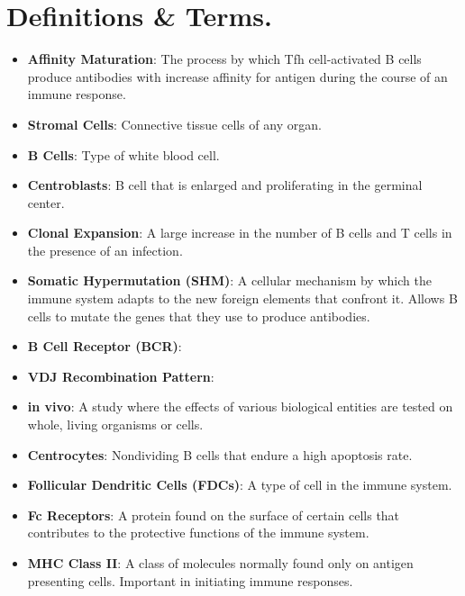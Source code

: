 \documentclass[english]{article}
\begin{document}
\section{Definitions \& Terms.}

\begin{itemize}


\item \textbf{Affinity Maturation}: The process by which Tfh cell-activated B cells produce antibodies with increase affinity for antigen during the course of an immune response. 

\item \textbf{Stromal Cells}: Connective tissue cells of any organ.
 
\item \textbf{B Cells}: Type of white blood cell. 

\item \textbf{Centroblasts}: B cell that is enlarged and proliferating in the germinal center.

\item \textbf{Clonal Expansion}: A large increase in the number of B cells and T cells in the presence of an infection. 

\item \textbf{Somatic Hypermutation (SHM)}: A cellular mechanism by which the immune system adapts to the new foreign elements that confront it. Allows B cells to mutate the genes that they use to produce antibodies. 

\item \textbf{B Cell Receptor (BCR)}:

\item \textbf{VDJ Recombination Pattern}: 

\item \textbf{in vivo}: A study where the effects of various biological entities are tested on whole, living organisms or cells. 

\item \textbf{Centrocytes}: Nondividing B cells that endure a high apoptosis rate. 

\item \textbf{Follicular Dendritic Cells (FDCs)}: A type of cell in the immune system.

\item \textbf{Fc Receptors}: A protein found on the surface of certain cells that contributes to the protective functions of the immune system. 

\item \textbf{MHC Class II}: A class of molecules normally found only on antigen presenting cells. Important in initiating immune responses. 


\end{itemize}
\end{document}
